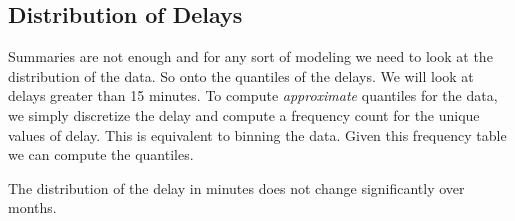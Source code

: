 \documentclass[letterpaper,10pt,english]{sphinxmanual}
\begin{document}
\subsection{Distribution of Delays}
\label{airline:distribution-of-delays}
Summaries are not enough and for any sort of modeling we need to look at the
distribution of the data. So onto the quantiles of the delays. We will look at
delays greater than 15 minutes. To compute \emph{approximate} quantiles for the data,
we simply discretize the delay and compute a frequency count for the unique
values of delay. This is equivalent to binning the data. Given this frequency
table we can compute the quantiles.

The distribution of the delay in minutes does not change significantly over
months.

\label{airline:delay-quantiles-by-month}
\end{document}

